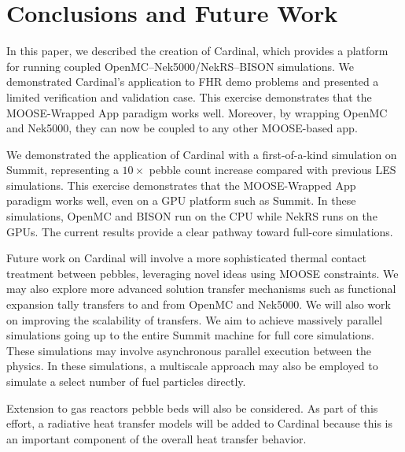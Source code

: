\section{Conclusions and Future Work}
\label{s:sum}


In this paper, we described the creation of Cardinal, which provides a platform for running coupled
OpenMC--Nek5000/NekRS--BISON simulations. We demonstrated Cardinal's application to FHR demo problems and
presented a limited verification and validation case. This exercise demonstrates that the MOOSE-Wrapped App
paradigm works well. Moreover, by wrapping OpenMC and Nek5000, they can now be coupled to any other MOOSE-based app.

We demonstrated the application of Cardinal with a first-of-a-kind simulation on Summit, representing a $10\times$ pebble count increase compared with previous LES simulations. This exercise demonstrates that the MOOSE-Wrapped App paradigm works well, even on a GPU platform such as Summit. In these simulations, OpenMC and BISON run on the CPU while NekRS runs on the GPUs. The current results provide a clear pathway toward full-core simulations.

Future work on Cardinal will involve a more sophisticated thermal contact treatment between pebbles,
leveraging novel ideas using MOOSE constraints. We may also explore more advanced solution transfer
mechanisms such as functional expansion tally transfers to and from OpenMC and Nek5000. We
will also work on improving the scalability of transfers. We aim to achieve massively parallel simulations going up to the entire Summit machine for full core simulations. These simulations may involve asynchronous parallel execution between the
physics. In these simulations, a multiscale approach may also be employed to simulate a select number of fuel particles directly.

Extension to gas reactors pebble beds will also be considered. As part of this effort, a radiative heat transfer models will be added to Cardinal because this is an important component of the overall heat transfer behavior.
